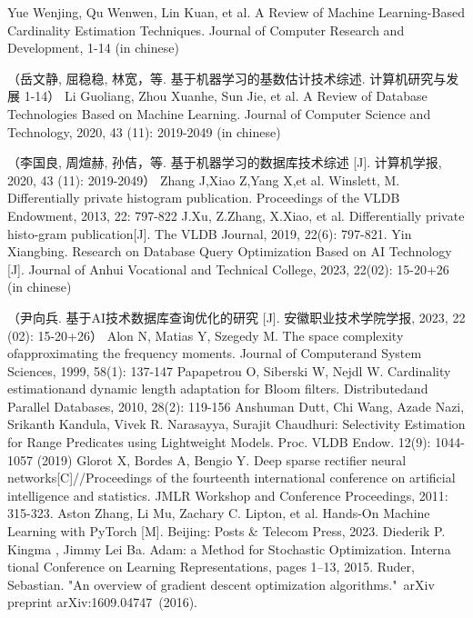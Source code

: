 \documentclass[UTF8, 12pt, a4paper, oneside]{ctexart}
\begin{document}
    \begin{thebibliography}{99}  
         Yue Wenjing, Qu Wenwen, Lin Kuan, et al. A Review of Machine Learning-Based Cardinality Estimation Techniques. Journal of Computer Research and Development, 1-14 (in chinese) \par （岳文静, 屈稳稳, 林宽，等. 基于机器学习的基数估计技术综述. 计算机研究与发展 1-14）
         Li Guoliang, Zhou Xuanhe, Sun Jie, et al. A Review of Database Technologies Based on Machine Learning. Journal of Computer Science and Technology, 2020, 43 (11): 2019-2049 (in chinese)\par （李国良, 周煊赫, 孙佶，等. 基于机器学习的数据库技术综述 [J]. 计算机学报, 2020, 43 (11): 2019-2049）
         Zhang J,Xiao Z,Yang X,et al. Winslett, M. Differentially private histogram publication. Proceedings of the VLDB Endowment, 2013, 22: 797-822
         J.Xu, Z.Zhang, X.Xiao, et al. Differentially private histo-gram publication[J]. The VLDB Journal, 2019, 22(6): 797-821.
         Yin Xiangbing. Research on Database Query Optimization Based on AI Technology [J]. Journal of Anhui Vocational and Technical College, 2023, 22(02): 15-20+26 (in chinese) \par （尹向兵. 基于AI技术数据库查询优化的研究 [J]. 安徽职业技术学院学报, 2023, 22 (02): 15-20+26）
         Alon N, Matias Y, Szegedy M. The space complexity ofapproximating the frequency moments. Journal of Computerand System Sciences, 1999, 58(1): 137-147
         Papapetrou O, Siberski W, Nejdl W. Cardinality estimationand dynamic length adaptation for Bloom filters. Distributedand Parallel Databases, 2010, 28(2): 119-156
         Anshuman Dutt, Chi Wang, Azade Nazi, Srikanth Kandula, Vivek R. Narasayya, Surajit Chaudhuri: Selectivity Estimation for Range Predicates using Lightweight Models. Proc. VLDB Endow. 12(9): 1044-1057 (2019)
         Glorot X, Bordes A, Bengio Y. Deep sparse rectifier neural networks[C]//Proceedings of the fourteenth international conference on artificial intelligence and statistics. JMLR Workshop and Conference Proceedings, 2011: 315-323.
         Aston Zhang, Li Mu, Zachary C. Lipton, et al. Hands-On Machine Learning with PyTorch [M]. Beijing: Posts \& Telecom Press, 2023.
         Diederik P. Kingma , Jimmy Lei Ba. Adam: a Method for Stochastic Optimization. Interna tional Conference on Learning Representations, pages 1–13, 2015.
         Ruder, Sebastian. "An overview of gradient descent optimization algorithms." arXiv preprint arXiv:1609.04747 (2016). 

\end{thebibliography}
\end{document}
